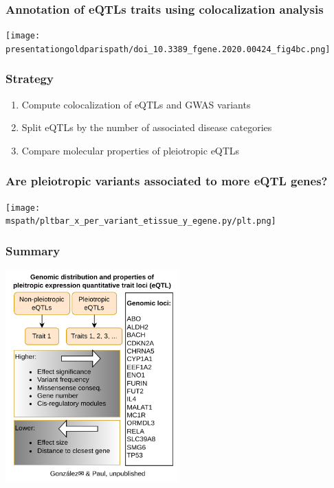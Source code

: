 \documentclass{beamer}
\newcommand*{\presentationgoldparispath}{../presentation_230120_gold2022_paris/fig/}%
\newcommand*{\mspath}{../../out/gwas417/pval_5e-08/r2_0.1/kb_1000/window_1000000/75_50}%
\begin{document}
    \begin{frame}
        \frametitle{Annotation of eQTLs traits using colocalization analysis}

        \begin{center}
            \texttt{[image: \\presentationgoldparispath/doi\_10.3389\_fgene.2020.00424\_fig4bc.png]}
        \end{center}

        \let\thefootnote\relax{}
    \end{frame}

    \begin{frame}
        \frametitle{Strategy}

        \begin{enumerate}
            \item Compute colocalization of eQTLs and GWAS variants
            \item Split eQTLs by the number of associated disease categories
            \item Compare molecular properties of pleiotropic eQTLs
        \end{enumerate}

    \end{frame}

    \begin{frame}
        \frametitle{Are pleiotropic variants associated to more eQTL genes?}

        \begin{center}
            \texttt{[image: \\mspath/pltbar\_x\_per\_variant\_etissue\_y\_egene.py/plt.png]}
        \end{center}

    \end{frame}

    \begin{frame}
        \frametitle{Summary}

        \begin{center}
            \includegraphics[width=0.5\textwidth]{fig/graphical_abstract.drawio.png}
        \end{center}

    \end{frame}
\end{document}
